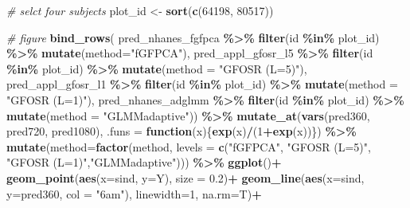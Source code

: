 \documentclass[
]{article}
\newenvironment{Shaded}{\begin{snugshade}}{\end{snugshade}}
\newcommand{\AttributeTok}[1]{\textcolor[rgb]{0.13,0.29,0.53}{#1}}
\newcommand{\CommentTok}[1]{\textcolor[rgb]{0.56,0.35,0.01}{\textit{#1}}}
\newcommand{\ControlFlowTok}[1]{\textcolor[rgb]{0.13,0.29,0.53}{\textbf{#1}}}
\newcommand{\DecValTok}[1]{\textcolor[rgb]{0.00,0.00,0.81}{#1}}
\newcommand{\FloatTok}[1]{\textcolor[rgb]{0.00,0.00,0.81}{#1}}
\newcommand{\FunctionTok}[1]{\textcolor[rgb]{0.13,0.29,0.53}{\textbf{#1}}}
\newcommand{\NormalTok}[1]{#1}
\newcommand{\OtherTok}[1]{\textcolor[rgb]{0.56,0.35,0.01}{#1}}
\newcommand{\SpecialCharTok}[1]{\textcolor[rgb]{0.81,0.36,0.00}{\textbf{#1}}}
\newcommand{\StringTok}[1]{\textcolor[rgb]{0.31,0.60,0.02}{#1}}
\begin{document}
\begin{Shaded}
\begin{Highlighting}[]
\CommentTok{\# selct four subjects}
\NormalTok{plot\_id }\OtherTok{\textless{}{-}} \FunctionTok{sort}\NormalTok{(}\FunctionTok{c}\NormalTok{(}\DecValTok{64198}\NormalTok{, }\DecValTok{80517}\NormalTok{))}

\CommentTok{\# figure}
\FunctionTok{bind\_rows}\NormalTok{(}
\NormalTok{  pred\_nhanes\_fgfpca }\SpecialCharTok{\%\textgreater{}\%} \FunctionTok{filter}\NormalTok{(id }\SpecialCharTok{\%in\%}\NormalTok{ plot\_id) }\SpecialCharTok{\%\textgreater{}\%} \FunctionTok{mutate}\NormalTok{(}\AttributeTok{method=}\StringTok{"fGFPCA"}\NormalTok{),}
\NormalTok{  pred\_appl\_gfosr\_l5 }\SpecialCharTok{\%\textgreater{}\%} \FunctionTok{filter}\NormalTok{(id }\SpecialCharTok{\%in\%}\NormalTok{ plot\_id) }\SpecialCharTok{\%\textgreater{}\%} \FunctionTok{mutate}\NormalTok{(}\AttributeTok{method =} \StringTok{"GFOSR (L=5)"}\NormalTok{),}
\NormalTok{  pred\_appl\_gfosr\_l1 }\SpecialCharTok{\%\textgreater{}\%} \FunctionTok{filter}\NormalTok{(id }\SpecialCharTok{\%in\%}\NormalTok{ plot\_id) }\SpecialCharTok{\%\textgreater{}\%} \FunctionTok{mutate}\NormalTok{(}\AttributeTok{method =} \StringTok{"GFOSR (L=1)"}\NormalTok{),}
\NormalTok{  pred\_nhanes\_adglmm }\SpecialCharTok{\%\textgreater{}\%} \FunctionTok{filter}\NormalTok{(id }\SpecialCharTok{\%in\%}\NormalTok{ plot\_id) }\SpecialCharTok{\%\textgreater{}\%} \FunctionTok{mutate}\NormalTok{(}\AttributeTok{method =} \StringTok{"GLMMadaptive"}\NormalTok{)) }\SpecialCharTok{\%\textgreater{}\%}
  \FunctionTok{mutate\_at}\NormalTok{(}\FunctionTok{vars}\NormalTok{(pred360, pred720, pred1080), }
                \AttributeTok{.funs =} \ControlFlowTok{function}\NormalTok{(x)\{}\FunctionTok{exp}\NormalTok{(x)}\SpecialCharTok{/}\NormalTok{(}\DecValTok{1}\SpecialCharTok{+}\FunctionTok{exp}\NormalTok{(x))\}) }\SpecialCharTok{\%\textgreater{}\%}
  \FunctionTok{mutate}\NormalTok{(}\AttributeTok{method=}\FunctionTok{factor}\NormalTok{(method, }
         \AttributeTok{levels =} \FunctionTok{c}\NormalTok{(}\StringTok{"fGFPCA"}\NormalTok{, }\StringTok{"GFOSR (L=5)"}\NormalTok{, }\StringTok{"GFOSR (L=1)"}\NormalTok{,}\StringTok{"GLMMadaptive"}\NormalTok{))) }\SpecialCharTok{\%\textgreater{}\%}
  \FunctionTok{ggplot}\NormalTok{()}\SpecialCharTok{+}
  \FunctionTok{geom\_point}\NormalTok{(}\FunctionTok{aes}\NormalTok{(}\AttributeTok{x=}\NormalTok{sind, }\AttributeTok{y=}\NormalTok{Y), }\AttributeTok{size =} \FloatTok{0.2}\NormalTok{)}\SpecialCharTok{+}
  \FunctionTok{geom\_line}\NormalTok{(}\FunctionTok{aes}\NormalTok{(}\AttributeTok{x=}\NormalTok{sind, }\AttributeTok{y=}\NormalTok{pred360, }\AttributeTok{col =} \StringTok{"6am"}\NormalTok{), }\AttributeTok{linewidth=}\DecValTok{1}\NormalTok{, }\AttributeTok{na.rm=}\NormalTok{T)}\SpecialCharTok{+}

\end{Highlighting}
\end{Shaded}
\end{document}
